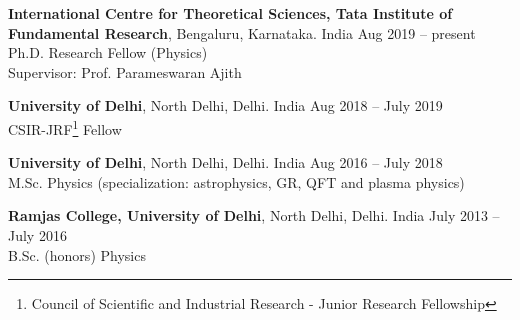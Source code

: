 {\bf International Centre for Theoretical Sciences, Tata Institute of Fundamental Research}, Bengaluru, Karnataka. India \hfill Aug 2019 -- present\\
Ph.D. Research Fellow (Physics)\\
Supervisor: Prof. Parameswaran Ajith

{\bf University of Delhi}, North Delhi, Delhi. India \hfill Aug 2018 -- July 2019\\
CSIR-JRF\footnote{Council of Scientific and Industrial Research - Junior Research Fellowship} Fellow

{\bf University of Delhi}, North Delhi, Delhi. India \hfill Aug 2016 -- July 2018\\
M.Sc. Physics (specialization: astrophysics, GR, QFT and plasma physics)

{\bf Ramjas College, University of Delhi}, North Delhi, Delhi. India \hfill July 2013 -- July 2016\\
B.Sc. (honors) Physics 


